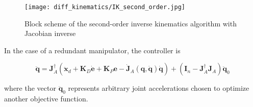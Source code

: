 \documentclass[10pt]{article}
\begin{document}
\begin{figure}[H]
    \centering
    \texttt{[image: diff\_kinematics/IK\_second\_order.jpg]}
    \caption{Block scheme of the second-order inverse kinematics algorithm with Jacobian inverse}
    \label{fig:enter-label111}
\end{figure}


In the case of a redundant manipulator, the controller is

$$
\ddot{\boldsymbol{q}}=\boldsymbol{J}_{A}^{\dagger}\left(\ddot{\boldsymbol{x}}_{d}+\boldsymbol{K}_{D} \dot{\boldsymbol{e}}+\boldsymbol{K}_{P} \boldsymbol{e}-\dot{\boldsymbol{J}}_{A}(\boldsymbol{q}, \dot{\boldsymbol{q}}) \dot{\boldsymbol{q}}\right)+\left(\boldsymbol{I}_{n}-\boldsymbol{J}_{A}^{\dagger} \boldsymbol{J}_{A}\right) \ddot{\boldsymbol{q}}_{0}
$$

where the vector $\ddot{\boldsymbol{q}}_{0}$ represents arbitrary joint accelerations chosen to optimize another objective function.
\end{document}
